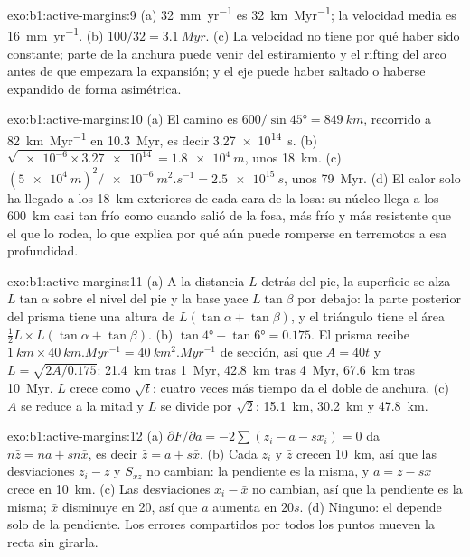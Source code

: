 \begin{solution}{exo:b1:active-margins:9}
(a) \qty{32}{mm.yr^{-1}} es \qty{32}{km.Myr^{-1}}; la velocidad media es
\qty{16}{mm.yr^{-1}}. (b) $100/32 = \qty{3.1}{Myr}$. (c) La velocidad no tiene por qué
haber sido constante; parte de la anchura puede venir del estiramiento y el rifting del arco antes de que empezara la expansión;
y el eje puede haber saltado o haberse expandido de forma asimétrica.
\end{solution}

\begin{solution}{exo:b1:active-margins:10}
(a) El camino es $600/\sin\ang{45} = \qty{849}{km}$, recorrido a
\qty{82}{km.Myr^{-1}} en \qty{10.3}{Myr}, es decir \qty{3.27e14}{s}.
(b) $\sqrt{\num{e-6}\times\num{3.27e14}} = \qty{1.8e4}{m}$, unos
\qty{18}{km}. (c) $(\qty{5e4}{m})^2/\qty{e-6}{m^2.s^{-1}} = \qty{2.5e15}{s}$,
unos \qty{79}{Myr}. (d) El calor solo ha llegado a los \qty{18}{km} exteriores de cada
cara de la losa: su núcleo llega a los \qty{600}{km} casi tan frío como cuando salió
de la fosa, más frío y más resistente que el  que lo rodea, lo que explica por qué
aún puede romperse en terremotos a esa profundidad.
\end{solution}

\begin{solution}{exo:b1:active-margins:11}
(a) A la distancia $L$ detrás del pie, la superficie se alza $L\tan\alpha$ sobre el nivel del pie
y la base yace $L\tan\beta$ por debajo: la parte posterior del prisma tiene una altura de
$L(\tan\alpha + \tan\beta)$, y el triángulo tiene el área
$\frac12 L\times L(\tan\alpha + \tan\beta)$. (b) $\tan\ang{4} + \tan\ang{6} =
0.175$. El prisma recibe $\qty{1}{km}\times\qty{40}{km.Myr^{-1}} =
\qty{40}{km^2.Myr^{-1}}$ de sección, así que $A = 40t$ y
$L = \sqrt{2A/0.175}$: \qty{21.4}{km} tras \qty{1}{Myr}, \qty{42.8}{km}
tras \qty{4}{Myr}, \qty{67.6}{km} tras \qty{10}{Myr}. $L$ crece como
$\sqrt t$: cuatro veces más tiempo da el doble de anchura. (c) $A$ se reduce a la mitad y $L$
se divide por $\sqrt2$: \qty{15.1}{km}, \qty{30.2}{km} y \qty{47.8}{km}.
\end{solution}

\begin{solution}{exo:b1:active-margins:12}
(a) $\partial F/\partial a = -2\sum(z_i - a - s x_i) = 0$ da
$n\bar z = na + sn\bar x$, es decir $\bar z = a + s\bar x$. (b) Cada $z_i$ y
$\bar z$ crecen \qty{10}{km}, así que las desviaciones $z_i - \bar z$ y $S_{xz}$
no cambian: la pendiente es la misma, y $a = \bar z - s\bar x$ crece en
\qty{10}{km}. (c) Las desviaciones $x_i - \bar x$ no cambian, así que la pendiente es
la misma; $\bar x$ disminuye en 20, así que $a$ aumenta en $20s$. (d) Ninguno:
el  depende solo de la pendiente. Los errores compartidos por todos los puntos
mueven la recta sin girarla.
\end{solution}

